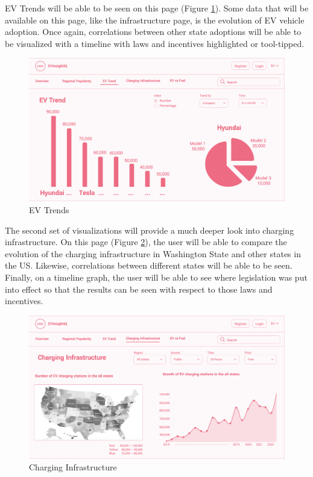 \documentclass{article}
\begin{document}
EV Trends will be able to be seen on this page (Figure \ref{fig:evtrends}).
Some data that will be available on this page, like the infrastructure page, is
the evolution of EV vehicle adoption.  Once again, correlations between other
state adoptions will be able to be visualized with a timeline with laws and
incentives highlighted or tool-tipped.
\begin{figure}[h]
    \centering
    \includegraphics[scale=0.25]{EV Trend}
    \caption{EV Trends}
    \label{fig:evtrends}
\end{figure}

The second set of visualizations will provide a much deeper look into charging
infrastructure.  On this page (Figure \ref{fig:charge}), the user will be able
to compare the evolution of the charging infrastructure in Washington State and
other states in the US.  Likewise, correlations between different states will be
able to be seen.  Finally, on a timeline graph, the user will be able to see
where legislation was put into effect so that the results can be seen with
respect to those laws and incentives.
\begin{figure}[h]
    \centering
    \includegraphics[scale=0.25]{Charging Infrastructure}
    \caption{Charging Infrastructure}
    \label{fig:charge}
\end{figure}
\end{document}
